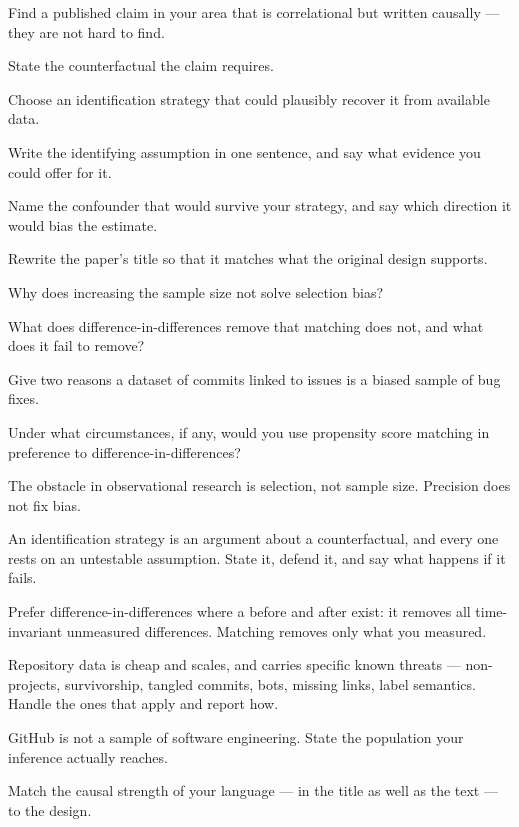 \begin{lab}
Find a published claim in your area that is correlational but written
causally --- they are not hard to find.

\begin{tightnum}
  \item State the counterfactual the claim requires.
  \item Choose an identification strategy that could plausibly recover it from
    available data.
  \item Write the identifying assumption in one sentence, and say what evidence
    you could offer for it.
  \item Name the confounder that would survive your strategy, and say which
    direction it would bias the estimate.
  \item Rewrite the paper's title so that it matches what the original design
    supports.
\end{tightnum}
\end{lab}

\begin{checkpoint}
\begin{tightnum}
  \item Why does increasing the sample size not solve selection bias?
  \item What does difference-in-differences remove that matching does not, and
    what does it fail to remove?
  \item Give two reasons a dataset of commits linked to issues is a biased
    sample of bug fixes.
  \item Under what circumstances, if any, would you use propensity score
    matching in preference to difference-in-differences?
\end{tightnum}
\end{checkpoint}

\begin{chaptersummary}
\begin{tight}
  \item The obstacle in observational research is selection, not sample size.
    Precision does not fix bias.
  \item An identification strategy is an argument about a counterfactual, and
    every one rests on an untestable assumption. State it, defend it, and say
    what happens if it fails.
  \item Prefer difference-in-differences where a before and after exist: it
    removes all time-invariant unmeasured differences. Matching removes only
    what you measured.
  \item Repository data is cheap and scales, and carries specific known threats
    --- non-projects, survivorship, tangled commits, bots, missing links, label
    semantics. Handle the ones that apply and report how.
  \item GitHub is not a sample of software engineering. State the population
    your inference actually reaches.
  \item Match the causal strength of your language --- in the title as well as
    the text --- to the design.
\end{tight}
\end{chaptersummary}

